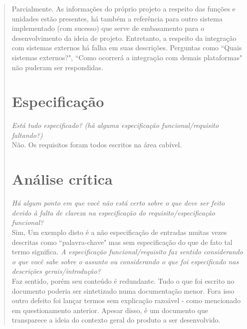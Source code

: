 \documentclass[12pt,a4paper]{report}
\begin{document}
\begin{quotation}
Parcialmente. As informações do próprio projeto a respeito das funções e unidades estão presentes, há também a referência para outro sistema implementado (com sucesso) que serve de embasamento para o desenvolvimento da ideia de projeto. Entretanto, a respeito da integração com sistemas externos há falha em suas descrições. Perguntas como ``Quais sistemas externos?", ``Como ocorrerá a integração com demais plataformas" não puderam ser respondidas. 
\section{Especificação}
\textit{Está tudo especificado? (há alguma especificação funcional/requisito faltando?)}\vspace{0.3cm}\\

Não. Os requisitos foram todos escritos na área cabível.
\section{Análise crítica}
	\textit{Há algum ponto em que você não está certo sobre o que deve ser feito devido à falta de clareza na especificação do requisito/especificação funcional?}\vspace{0.3cm}\\
	Sim, Um exemplo disto é a não especificação de entradas muitas vezes descritas como ``palavra-chave" mas sem especificação do que de fato tal termo significa.
	\newpage
	\textit{A especificação funcional/requisito faz sentido considerando o que você sabe sobre o assunto ou considerando o que foi especificado nas descrições gerais/introdução?}\vspace{0.3cm}\\
	
	Faz sentido, porém seu conteúdo é redundante. Tudo o que foi escrito no documento poderia ser sintetizado numa documentação menor. Fora isso outro defeito foi lançar termos sem explicação razoável - como mencionado em questionamento anterior. Apesar disso, é um documento que transparece a ideia do contexto geral do produto a ser desenvolvido.
	
\end{quotation}
\end{document}
